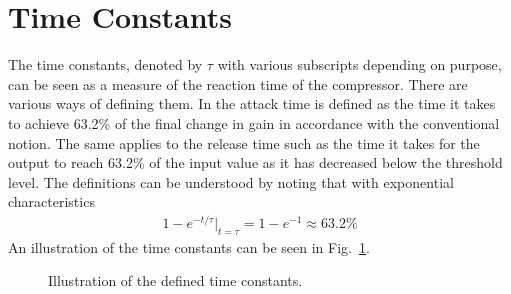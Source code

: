 \documentclass[../main2.tex]{subfiles}
\providecommand{\rootdir}{..}
\begin{document}
\section{Time Constants}\label{appendix_time_constants}
The time constants, denoted by $\tau$ with various subscripts depending on purpose, can be seen as a measure of the reaction time of the compressor. There are various ways of defining them. In \cite{mcnally1984dynamic} the attack time is defined as the time it takes to achieve 63.2\% of the final change in gain in accordance with the conventional notion. The same applies to the release time such as the time it takes for the output to reach 63.2\% of the input value as it has decreased below the threshold level. The definitions can be understood by noting that with exponential characteristics
\begin{align}
1-e^{-t / \tau}\rvert_{t=\tau} = 1-e^{-1} \approx 63.2\% \label{eq:time_const}
\end{align}
An illustration of the time constants can be seen in Fig.~\ref{fig:time_constants}.
\begin{figure}[h]
\centerline{}
\caption{Illustration of the defined time constants.}
\label{fig:time_constants}
\end{figure}
\end{document}
